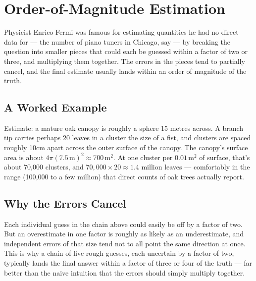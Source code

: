 \chapter{Order-of-Magnitude Estimation}
\label{ch:estimation}

Physicist Enrico Fermi was famous for estimating quantities he had no
direct data for — the number of piano tuners in Chicago, say — by
breaking the question into smaller pieces that could each be guessed
within a factor of two or three, and multiplying them together. The
errors in the pieces tend to partially cancel, and the final estimate
usually lands within an order of magnitude of the truth.

\section{A Worked Example}
\label{sec:worked-example}

\begin{example}
Estimate: a mature oak canopy is roughly a sphere 15 metres across.
A branch tip carries perhaps 20 leaves in a cluster the size of a
fist, and clusters are spaced roughly 10cm apart across the outer
surface of the canopy. The canopy's surface area is about
$4\pi (7.5\,\text{m})^2 \approx 700\,\text{m}^2$. At one cluster per
$0.01\,\text{m}^2$ of surface, that's about 70{,}000 clusters, and
$70{,}000 \times 20 \approx 1.4$ million leaves — comfortably in the
range (100{,}000 to a few million) that direct counts of oak trees
actually report.
\end{example}

\section{Why the Errors Cancel}
\label{sec:why-errors-cancel}

Each individual guess in the chain above could easily be off by a
factor of two. But an overestimate in one factor is roughly as likely
as an underestimate, and independent errors of that size tend not to
all point the same direction at once. This is why a chain of five
rough guesses, each uncertain by a factor of two, typically lands the
final answer within a factor of three or four of the truth — far
better than the naive intuition that the errors should simply
multiply together.
